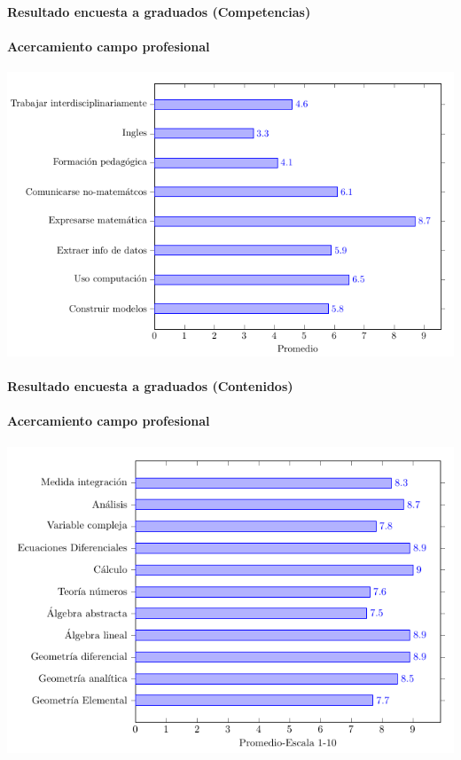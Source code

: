 \documentclass[a4paper,10pt,BCOR10mm,oneside,headsepline]{scrbook}
\begin{document}
\paragraph{Resultado encuesta a graduados (Competencias)}
\paragraph{Acercamiento campo profesional}




\begin{center}
 \includegraphics[scale=.5]{barras5.png}
 
\end{center} 








\paragraph{Resultado encuesta a graduados (Contenidos)}
\paragraph{Acercamiento campo profesional}




\begin{center}
 \includegraphics[scale=.5]{barras6.png}
 \end{center} 
\end{document}
